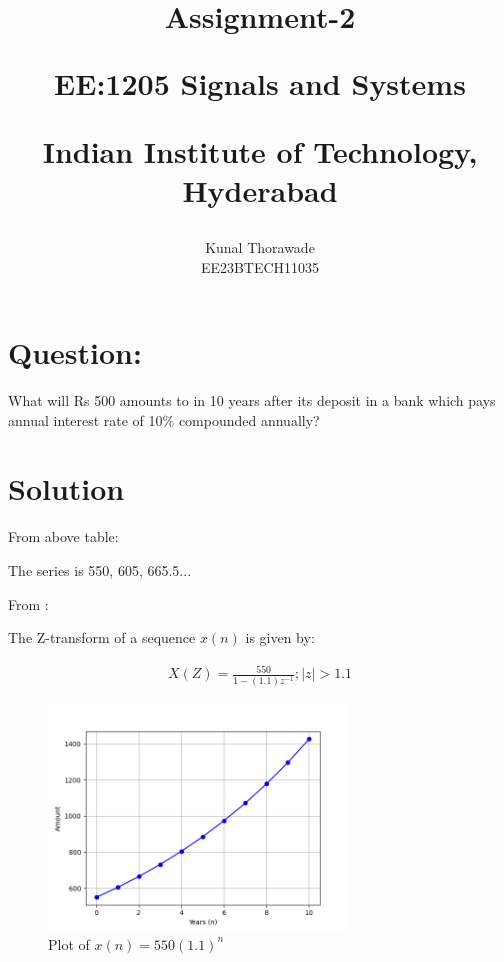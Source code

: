 \documentclass[journal,12pt,twocolumn]{IEEEtran}
\theoremstyle{remark}
\begin{document}
%




\vspace{3cm}

\title{
Assignment-2

\large{EE:1205 Signals and Systems}

Indian Institute of Technology, Hyderabad
}
\author{Kunal Thorawade

EE23BTECH11035
}	

\maketitle


\newpage


\bigskip
 
\renewcommand{\thefigure}{\theenumi}
\renewcommand{\thetable}{\arabic{table}}

\section{Question:}
What will Rs 500 amounts to in 10 years after its deposit in a bank which pays annual interest rate of 10$\%$ compounded annually?

\section{Solution}

From above table:

The series is 550, 605, 665.5...


From :

The Z-transform of a sequence $x(n)$ is given by:

\begin{align}
    X(Z) = \frac{550}{1 - (1.1)z^{-1}} ; |z| > 1.1
\end{align}

\begin{figure}
    \centering
    \includegraphics[width = 8cm]{figs/fig1.png}
    \caption{Plot of $x(n) = 550(1.1)^n$}
    \label{fig:enter-label}
\end{figure}
\end{document}
